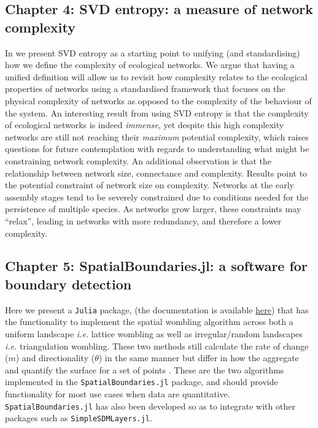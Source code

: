 \subsection{Chapter 4: SVD entropy: a measure of network complexity}

In \cite{Strydom2021SvdEnt} we present SVD entropy as a starting point to
unifying (and standardising) how we define the complexity of ecological
networks. We argue that having a unified definition will allow us to
revisit how complexity relates to the ecological properties of networks
using a standardised framework that focuses on the physical complexity
of networks as opposed to the complexity of the behaviour of the system.
An interesting result from using SVD entropy is that the complexity of
ecological networks is indeed \emph{immense}, yet despite this high
complexity networks are still not reaching their \emph{maximum}
potential complexity, which raises questions for future contemplation
with regards to understanding what might be constraining network
complexity. An additional observation is that the relationship between 
network size, connectance and complexity. Results
point to the potential constraint of network size on complexity.
Networks at the early assembly stages tend to be severely constrained
\cite{Barbier2018GenAss, Saravia2018EcoNet} due to conditions needed
for the persistence of multiple species. As networks grow larger, these
constraints may ``relax'', leading in networks with more redundancy, and
therefore a lower complexity.

\subsection{Chapter 5: SpatialBoundaries.jl: a software for boundary detection}

Here we present a \texttt{Julia} package, (the documentation is available
\href{https://poisotlab.github.io/SpatialBoundaries.jl/dev/}{here})
that has the functionality to implement the spatial wombling algorithm
across both a uniform landscape \emph{i.e.} lattice wombling as well as
irregular/random landscapes \emph{i.e.} triangulation wombling. These
two methods still calculate the rate of change (\(m\)) and
directionality (\(\theta\)) in the same manner but differ in how the
aggregate and quantify the surface for a set of points
\cite{Fortin2005SpaAna}. These are the two algorithms implemented in the
\texttt{SpatialBoundaries.jl} package, and should provide functionality
for most use cases when data are quantitative. \texttt{SpatialBoundaries.jl} 
has also been developed so as to integrate with other packages such as
\texttt{SimpleSDMLayers.jl}.

